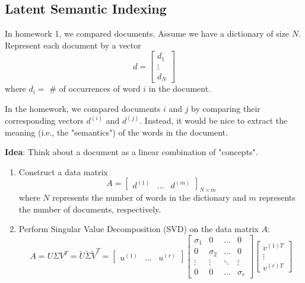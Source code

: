 \subsection{Latent Semantic Indexing}
\begin{example}
    In homework 1, we compared documents. Assume we have a dictionary of size \( N \). Represent each document by a vector 
    \[
    d = \begin{bmatrix} d_1 \\ \vdots \\ d_N \end{bmatrix}
    \]
    where \( d_i = \) \# of occurrences of word \( i \) in the document.
    \vspace{1em}

    In the homework, we compared documents \( i \) and \( j \) by comparing their corresponding vectors \( d^{(i)} \) and \( d^{(j)} \). Instead, it would be nice to extract the meaning (i.e., the "semantics") of the words in the document.
    \vspace{1em}

    \textbf{Idea}: Think about a document as a linear combination of "concepts". 
    \begin{enumerate}
        \item Construct a data matrix 
        \[
        A = \begin{bmatrix} d^{(1)} & \ldots & d^{(m)} \end{bmatrix}_{N\times m}
        \]
        where \( N \) represents the number of words in the dictionary and $m$ represents the number of documents, respectively.
        \vspace{1em}
        
        \item Perform Singular Value Decomposition (SVD) on the data matrix \( A \):
        \[
        A = U \Sigma V^T = \tilde{U} \tilde{\Sigma} \tilde{V}^T = \begin{bmatrix} u^{(1)} & \ldots & u^{(r)} \end{bmatrix} 
        \begin{bmatrix}
        \sigma_1 & 0 & \ldots & 0 \\
        0 & \sigma_2 & \ldots & 0 \\
        \vdots & \vdots & \ddots & \vdots \\
        0 & 0 & \ldots & \sigma_r
        \end{bmatrix} 
        \begin{bmatrix} v^{(1)T} \\ \vdots \\ v^{(r)T} \end{bmatrix}
        \]
    

\end{enumerate}
\end{example}
